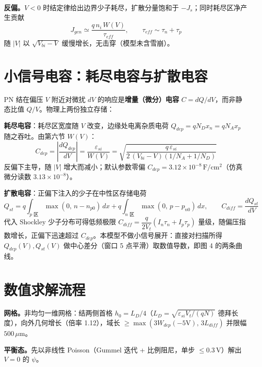 \documentclass[11pt]{ctexart}
\begin{document}
\textbf{反偏。}$V<0$ 时结定律给出边界少子耗尽，扩散分量饱和于 $-J_s$；同时耗尽区净产生贡献
\[J_{gen}\simeq\frac{q\,n_i\,W(V)}{\tau_{eff}},\qquad \tau_{eff}\sim\tau_n+\tau_p\]
随 $|V|$ 以 $\sqrt{V_{bi}-V}$ 缓慢增长，无击穿（模型未含雪崩）。

\section{小信号电容：耗尽电容与扩散电容}

PN 结在偏压 $V$ 附近对微扰 $dV$ 的响应是\textbf{增量（微分）电容} $C=dQ/dV$，而非静态比值 $Q/V$。物理上两份独立存储：

\textbf{耗尽电容}：耗尽区宽度随 $V$ 改变，边缘处电离杂质电荷 $Q_{dep}=qN_D x_n=qN_A x_p$ 随之吞吐。由第六节 $W(V)$：
\[C_{dep}=\left|\frac{dQ_{dep}}{dV}\right|=\frac{\varepsilon_{si}}{W(V)}=\sqrt{\frac{q\,\varepsilon_{si}}{2\,(V_{bi}-V)\left(1/N_A+1/N_D\right)}}\]
反偏下主导，随 $|V|$ 增大而减小；默认参数零偏 $C_{dep}=3.12\times10^{-8}\,\mathrm{F/cm^2}$（仿真微分读数 $3.13\times10^{-8}$）。

\textbf{扩散电容}：正偏下注入的少子在中性区存储电荷
\[Q_{st}=q\int_{p\text{ 区}}\max(0,\,n-n_{p0})\,dx+q\int_{n\text{ 区}}\max(0,\,p-p_{n0})\,dx,\qquad C_{diff}=\frac{dQ_{st}}{dV}\]
代入 Shockley 少子分布可得低频极限 $C_{diff}=\dfrac{q}{2V_t}\left(I_n\tau_n+I_p\tau_p\right)$ 量级，随偏压指数增长，正偏下迅速超过 $C_{dep}$。本模型不做小信号展开：直接对扫描所得 $Q_{dep}(V),Q_{st}(V)$ 做中心差分（窗口 5 点平滑）取数值导数，即图 4 的两条曲线。

\section{数值求解流程}

\textbf{网格。}非均匀一维网格：结两侧首格 $h_0=L_D/4$（$L_D=\sqrt{\varepsilon_{si}V_t/(qN)}$ 德拜长度），向外几何增长（倍率 1.12），域长 $\ge\max(3W_{dep}(-5\mathrm{V}),\,3L_{diff})$ 并限幅 $500\,\mu\mathrm{m}$。

\textbf{平衡态。}先以非线性 Poisson（Gummel 迭代 + 比例阻尼，单步 $\le0.3\,\mathrm{V}$）解出 $V=0$ 的 $\psi$。
\end{document}

